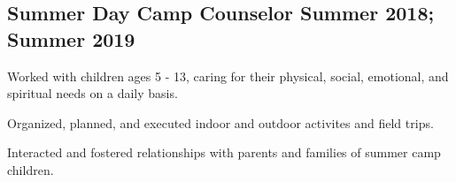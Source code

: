 \subsection{{Summer Day Camp Counselor \hfill Summer 2018; Summer 2019}}
\begin{zitemize}
\item Worked with children ages 5 - 13, caring for their physical, social, emotional, and spiritual needs on a daily basis.
\item Organized, planned, and executed indoor and outdoor activites and field trips.
\item Interacted and fostered relationships with parents and families of summer camp children.
\end{zitemize}